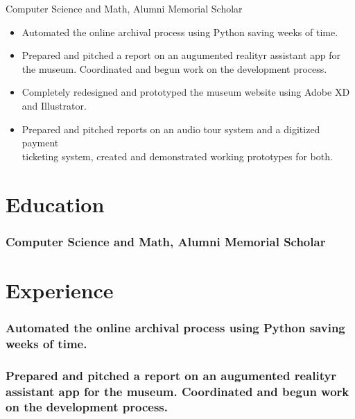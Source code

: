 \documentclass[a4paper]{resume}
\begin{document}
\vspace*{-40pt}


Computer Science and Math, Alumni Memorial Scholar\\

\begin{itemize}
	\item Automated the online archival process using Python saving weeks of time.
	\item Prepared and pitched a report on an augumented realityr assistant app for the museum. Coordinated and begun work on the development process.
	\item Completely redesigned and prototyped the museum website using Adobe XD and Illustrator.
	\item Prepared and pitched reports on an audio tour system and a digitized payment\\ticketing system, created and demonstrated working prototypes for both.
\end{itemize}



\section{Education}
\subsubsection{Computer Science and Math, Alumni Memorial Scholar}

\section{Experience}
\subsubsection{Automated the online archival process using Python saving weeks of time.}
\subsubsection{Prepared and pitched a report on an augumented realityr assistant app for the museum. Coordinated and begun work on the development process.}
\end{document}

